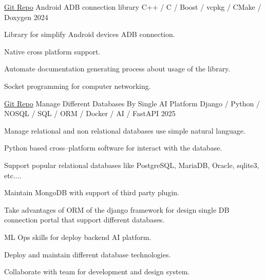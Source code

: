

\begin{cventries}

  \cventry
    {\href{https://github.com/drsamitha/adbLib}{Git Repo}} %
    {Android ADB connection library} %
    {C++ / C / Boost / vcpkg / CMake / Doxygen} %
    {2024} %
    {
      \begin{cvitems} %
        \item {Library for simplify Android devices ADB connection.}
        \item {Native cross platform support.}
        \item {Automate documentation generating process about usage of the library.}
        \item {Socket programming for computer networking.}
      \end{cvitems}
    }

  \cventry
    {\href{https://github.com/drsamitha/Demo_DBMS}{Git Repo}} %
    {Manage Different Databases By Single AI Platform} %
    {Django / Python / NOSQL / SQL / ORM / Docker / AI / FastAPI} %
    {2025} %
    {
      \begin{cvitems} %
        \item {Manage relational and non relational databases use simple natural language.}
        \item {Python based cross--platform software for interact with the database.}
        \item {Support popular relational databases like PostgreSQL, MariaDB, Oracle, sqlite3, etc....}
        \item {Maintain MongoDB with support of third party plugin.}
        \item {Take advantages of ORM of the django framework for design single DB connection portal that support different databases.}
        \item {ML Ops skills for deploy backend AI platform.}
        \item {Deploy and maintain different database technologies.}
        \item {Collaborate with team for development and design system.}
      \end{cvitems}
    }


\end{cventries}
